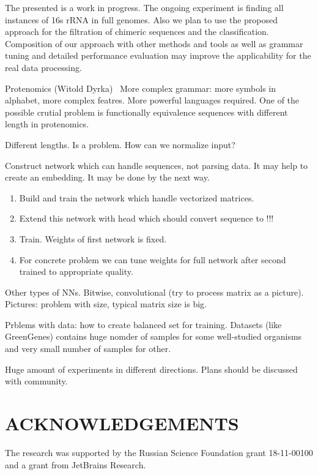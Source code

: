 \documentclass[a4paper,twoside]{article}
\begin{document}
\noindent The presented is a work in progress. 
The ongoing experiment is finding all instances of 16s rRNA in full genomes.
Also we plan to use the proposed approach for the filtration of chimeric sequences and the classification.
Composition of our approach with other methods and tools as well as grammar tuning and detailed performance evaluation may improve the applicability for the real data processing.

Protenomics (Witold Dyrka)~\cite{DBLP:Witold:Proteins}
More complex grammar: more symbols in alphabet, more complex featres.
More powerful languages required.
One of the possible crutial problem is functionally equivalence sequences with different length in protenomics.

Different lengths. Is a problem.
How can we normalize input?

Construct network which can handle sequences, not parsing data.
It may help to create an embedding.
It may be done by the next way.
\begin{enumerate}
\item Build and train the network which handle vectorized matrices.
\item Extend this network with head which should convert sequence to !!!
\item Train. Weights of first network is fixed.
\item For concrete problem we can tune weights for full network after second trained to appropriate quality.
\end{enumerate}

Other types of NNs.
Bitwise, convolutional (try to process matrix as a picture).
Pictures: problem with size, typical matrix size is big.

Prblems with data: how to create balanced set for training.
Datasets (like GreenGenes) contains huge nomder of samples for some well-studied organisms and very small number of samples for other.

Huge amount of experiments in different directions.
Plans should be discussed with community.


\section*{\uppercase{Acknowledgements}}

\noindent The research was supported by the Russian Science Foundation grant 18-11-00100 and a grant from JetBrains Research.




{\small
}


\vfill
\end{document}
